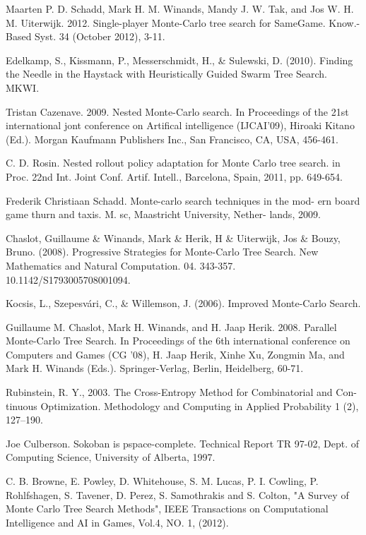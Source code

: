 \begin{thebibliography}{30}
Maarten P. D. Schadd, Mark H. M. Winands, Mandy J. W. Tak, and Jos W. H. M. Uiterwijk. 2012. Single-player Monte-Carlo tree search for SameGame. Know.-Based Syst. 34 (October 2012), 3-11.

Edelkamp, S., Kissmann, P., Messerschmidt, H., \& Sulewski, D. (2010). Finding the Needle in the Haystack with Heuristically Guided Swarm Tree Search. MKWI.

Tristan Cazenave. 2009. Nested Monte-Carlo search. In Proceedings of the 21st international jont conference on Artifical intelligence (IJCAI'09), Hiroaki Kitano (Ed.). Morgan Kaufmann Publishers Inc., San Francisco, CA, USA, 456-461.

C. D. Rosin. Nested rollout policy adaptation for Monte Carlo tree search. in Proc. 22nd Int. Joint Conf. Artif. Intell., Barcelona, Spain,
2011, pp. 649-654.

Frederik Christiaan Schadd. Monte-carlo search techniques in the mod-
ern board game thurn and taxis. M. sc, Maastricht University, Nether-
lands, 2009.

Chaslot, Guillaume \& Winands, Mark \& Herik, H \& Uiterwijk, Jos \& Bouzy, Bruno. (2008). Progressive Strategies for Monte-Carlo Tree Search. New Mathematics and Natural Computation. 04. 343-357. 10.1142/S1793005708001094. 

Kocsis, L., Szepesvári, C., \& Willemson, J. (2006). Improved Monte-Carlo Search.

Guillaume M. Chaslot, Mark H. Winands, and H. Jaap Herik. 2008. Parallel Monte-Carlo Tree Search. In Proceedings of the 6th international conference on Computers and Games (CG '08), H. Jaap Herik, Xinhe Xu, Zongmin Ma, and Mark H. Winands (Eds.). Springer-Verlag, Berlin, Heidelberg, 60-71.

Rubinstein, R. Y., 2003. The Cross-Entropy Method for Combinatorial and Con-
tinuous Optimization. Methodology and Computing in Applied Probability
1 (2), 127–190.

Joe Culberson. Sokoban is pspace-complete. Technical Report TR 97-02, Dept. of Computing Science, University of Alberta, 1997.

C. B. Browne, E. Powley, D. Whitehouse, S. M. Lucas, P. I. Cowling, P. Rohlfshagen, S. Tavener, D. Perez, S. Samothrakis and S. Colton, "A Survey of Monte Carlo Tree Search Methods", IEEE Transactions on Computational Intelligence and AI in Games, Vol.4, NO. 1, (2012).


\end{thebibliography}
